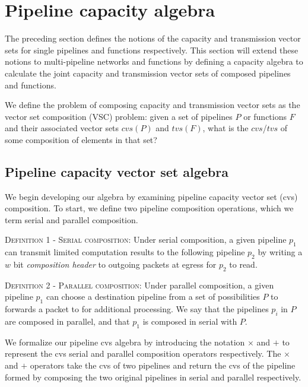 \section{Pipeline capacity algebra}\label{sec:pipeline-capacity-algebra}
\noindent The preceding section defines the notions of the capacity and transmission vector sets for single pipelines and functions respectively. This section will extend these notions to multi-pipeline networks and functions by defining a capacity algebra to calculate the joint capacity and transmission vector sets of composed pipelines and functions.

 We define the problem of composing capacity and transmission vector sets as the vector set composition (VSC) problem: given a set of pipelines $P$ or functions $F$ and their associated vector sets $cvs(P)$ and $tvs(F)$, what is the $cvs$/$tvs$ of some composition of elements in that set?

\subsection{Pipeline capacity vector set algebra}
 We begin developing our algebra by examining pipeline capacity vector set (cvs) composition. To start, we define two pipeline composition operations, which we term serial and parallel composition.

\vspace{3mm}
\noindent \textsc{Definition 1 - Serial composition:} Under serial composition, a given pipeline $p_1$ can transmit limited computation results to the following pipeline $p_2$ by writing a $w$ bit \textit{composition header} to outgoing packets at egress for $p_2$ to read.

\vspace{3mm}
\noindent \textsc{Definition 2 - Parallel composition:} Under parallel composition, a given pipeline $p_1$ can choose a destination pipeline from a set of possibilities $P$ to forwards a packet to for additional processing. We say that the pipelines $p_i$ in $P$ are composed in parallel, and that $p_1$ is composed in serial with $P$.

 We formalize our pipeline cvs algebra by introducing the notation $\times$ and $+$ to represent the cvs serial and parallel composition operators respectively. The $\times$ and $+$ operators take the cvs of two pipelines and return the cvs of the pipeline formed by composing the two original pipelines in serial and parallel respectively.

